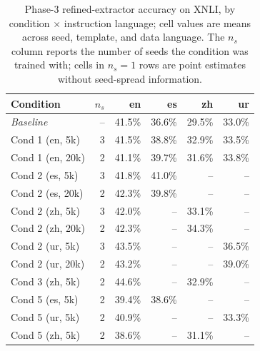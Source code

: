 \begin{table}[t]
  \centering
  \small
  \begin{tabular}{lrrrrr}
    \toprule
    Condition & $n_s$ & en & es & zh & ur \\
    \midrule
    \textit{Baseline} & -- & 41.5\% & 36.6\% & 29.5\% & 33.0\% \\
    Cond 1 (en, 5k) & 3 & 41.5\% & 38.8\% & 32.9\% & 33.5\% \\
    Cond 1 (en, 20k) & 2 & 41.1\% & 39.7\% & 31.6\% & 33.8\% \\
    Cond 2 (es, 5k) & 3 & 41.8\% & 41.0\% & -- & -- \\
    Cond 2 (es, 20k) & 2 & 42.3\% & 39.8\% & -- & -- \\
    Cond 2 (zh, 5k) & 3 & 42.0\% & -- & 33.1\% & -- \\
    Cond 2 (zh, 20k) & 2 & 42.3\% & -- & 34.3\% & -- \\
    Cond 2 (ur, 5k) & 3 & 43.5\% & -- & -- & 36.5\% \\
    Cond 2 (ur, 20k) & 2 & 43.2\% & -- & -- & 39.0\% \\
    Cond 3 (zh, 5k) & 2 & 44.6\% & -- & 32.9\% & -- \\
    Cond 5 (es, 5k) & 2 & 39.4\% & 38.6\% & -- & -- \\
    Cond 5 (ur, 5k) & 2 & 40.9\% & -- & -- & 33.3\% \\
    Cond 5 (zh, 5k) & 2 & 38.6\% & -- & 31.1\% & -- \\
    \bottomrule
  \end{tabular}
  \caption{Phase-3 refined-extractor accuracy on \textsc{XNLI}, by condition $\times$ instruction language; cell values are means across seed, template, and data language. The $n_s$ column reports the number of seeds the condition was trained with; cells in $n_s\!=\!1$ rows are point estimates without seed-spread information.}
  \label{tab:t1-xnli}
\end{table}

